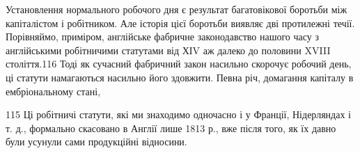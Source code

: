 Установлення нормального робочого дня є результат багатовікової
боротьби між капіталістом і робітником. Але історія цієї
боротьби виявляє дві протилежні течії. Порівняймо, приміром,
англійське фабричне законодавство нашого часу з англійськими
робітничими статутами від ХІV аж далеко до половини XVIII
століття.116 Тоді як сучасний фабричний закон насильно скорочує
робочий день, ці статути намагаються насильно його здовжити.
Певна річ, домагання капіталу в ембріональному стані,

115    Ці робітничі статути, які ми знаходимо одночасно і у Франції,
Нідерляндах і т. д., формально скасовано в Англії лише 1813 р., вже після
того, як їх давно були усунули сами продукційні відносини.